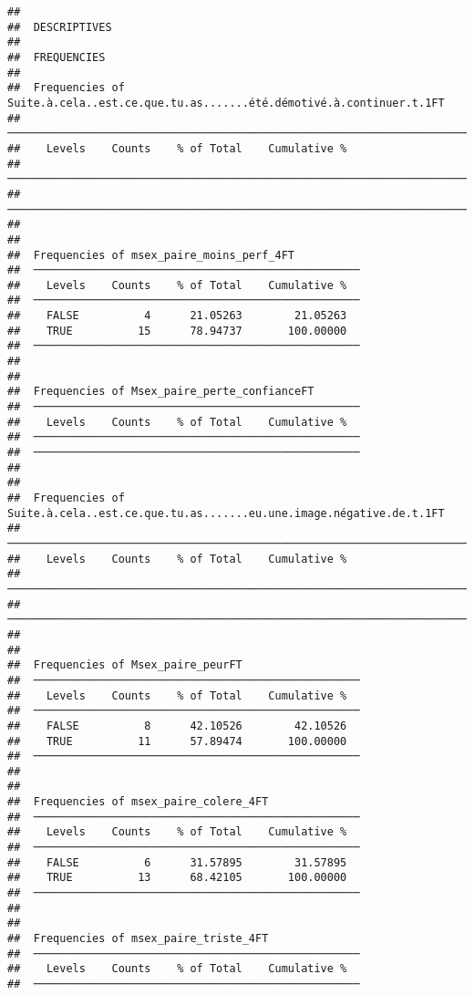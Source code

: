 \documentclass[
]{article}
\begin{document}
\begin{verbatim}
## 
##  DESCRIPTIVES
## 
##  FREQUENCIES
## 
##  Frequencies of Suite.à.cela..est.ce.que.tu.as.......été.démotivé.à.continuer.t.1FT 
##  ────────────────────────────────────────────────────────────────────────────────── 
##    Levels    Counts    % of Total    Cumulative %   
##  ────────────────────────────────────────────────────────────────────────────────── 
##  ────────────────────────────────────────────────────────────────────────────────── 
## 
## 
##  Frequencies of msex_paire_moins_perf_4FT           
##  ────────────────────────────────────────────────── 
##    Levels    Counts    % of Total    Cumulative %   
##  ────────────────────────────────────────────────── 
##    FALSE          4      21.05263        21.05263   
##    TRUE          15      78.94737       100.00000   
##  ────────────────────────────────────────────────── 
## 
## 
##  Frequencies of Msex_paire_perte_confianceFT        
##  ────────────────────────────────────────────────── 
##    Levels    Counts    % of Total    Cumulative %   
##  ────────────────────────────────────────────────── 
##  ────────────────────────────────────────────────── 
## 
## 
##  Frequencies of Suite.à.cela..est.ce.que.tu.as.......eu.une.image.négative.de.t.1FT 
##  ────────────────────────────────────────────────────────────────────────────────── 
##    Levels    Counts    % of Total    Cumulative %   
##  ────────────────────────────────────────────────────────────────────────────────── 
##  ────────────────────────────────────────────────────────────────────────────────── 
## 
## 
##  Frequencies of Msex_paire_peurFT                   
##  ────────────────────────────────────────────────── 
##    Levels    Counts    % of Total    Cumulative %   
##  ────────────────────────────────────────────────── 
##    FALSE          8      42.10526        42.10526   
##    TRUE          11      57.89474       100.00000   
##  ────────────────────────────────────────────────── 
## 
## 
##  Frequencies of msex_paire_colere_4FT               
##  ────────────────────────────────────────────────── 
##    Levels    Counts    % of Total    Cumulative %   
##  ────────────────────────────────────────────────── 
##    FALSE          6      31.57895        31.57895   
##    TRUE          13      68.42105       100.00000   
##  ────────────────────────────────────────────────── 
## 
## 
##  Frequencies of msex_paire_triste_4FT               
##  ────────────────────────────────────────────────── 
##    Levels    Counts    % of Total    Cumulative %   
##  ────────────────────────────────────────────────── 

\end{verbatim}
\end{document}
